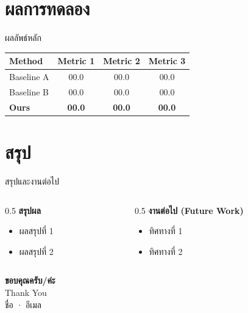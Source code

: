 \documentclass[aspectratio=169,10pt]{beamer}
\begin{document}
\section{ผลการทดลอง}

\begin{frame}{ผลลัพธ์หลัก}
  \centering
  \begin{tabular}{@{}lccc@{}}
    \toprule
    \textbf{Method} & \textbf{Metric 1} & \textbf{Metric 2} & \textbf{Metric 3} \\
    \midrule
    Baseline A  & 00.0 & 00.0 & 00.0 \\
    Baseline B  & 00.0 & 00.0 & 00.0 \\
    \textbf{Ours} & \textbf{00.0} & \textbf{00.0} & \textbf{00.0} \\
    \bottomrule
  \end{tabular}
\end{frame}

\section{สรุป}

\begin{frame}{สรุปและงานต่อไป}
  \begin{columns}
    \begin{column}{0.5\textwidth}
      \textbf{สรุปผล}
      \begin{itemize}
        \item ผลสรุปที่ 1
        \item ผลสรุปที่ 2
      \end{itemize}
    \end{column}
    \begin{column}{0.5\textwidth}
      \textbf{งานต่อไป (Future Work)}
      \begin{itemize}
        \item ทิศทางที่ 1
        \item ทิศทางที่ 2
      \end{itemize}
    \end{column}
  \end{columns}
\end{frame}

\begin{frame}
  \centering
  \vspace{1cm}
  {\Huge \textbf{ขอบคุณครับ/ค่ะ}}\\[12pt]
  {\large Thank You}\\[24pt]
  {\color{muted} ชื่อ · อีเมล}
\end{frame}
\end{document}
